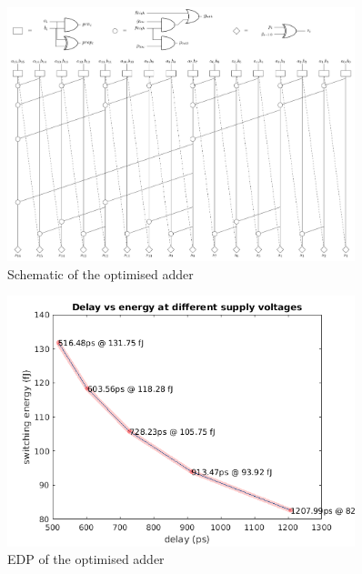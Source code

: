 \documentclass[english]{article}
\begin{document}
\begin{figure}[H]
\begin{centering}
\includegraphics[angle=90,width=0.9\textwidth]{figures/modifiedBrentKung_tex}
\par\end{centering}
\caption{Schematic of the optimised adder}
\label{modifiedAdderSchematic}
\end{figure}

\begin{figure}[H]
\begin{centering}
\includegraphics[width=0.9\textwidth]{figures/EDPlabeled.png}
\par\end{centering}
\caption{EDP of the optimised adder}
\label{adderSchematic}
\end{figure}

\medskip
\end{document}
